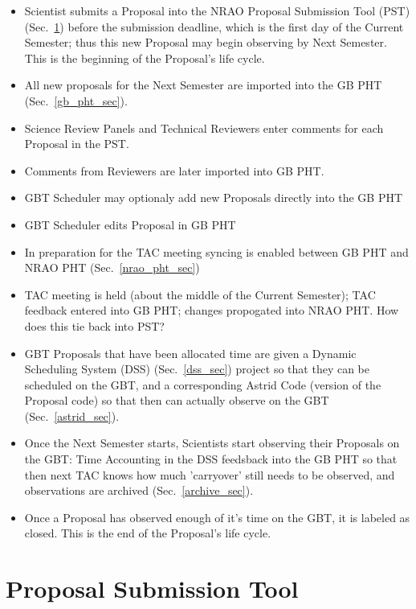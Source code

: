 \documentclass{article}
\begin{document}
\begin{itemize}
\item Scientist submits a Proposal into the NRAO Proposal Submission Tool
(PST) (Sec.~\ref{pst_sec}) before the submission deadline, which is the first day of the Current
Semester; thus this new Proposal may begin observing by Next Semester.  This
is the beginning of the Proposal's life cycle.
\item All new proposals for the Next Semester are imported into the GB PHT (Sec.~\ref{gb_pht_sec}).
\item Science Review Panels and Technical Reviewers enter comments for each
Proposal in the PST.
\item Comments from Reviewers are later imported into GB PHT.
\item GBT Scheduler may optionaly add new Proposals directly into the GB PHT
\item GBT Scheduler edits Proposal in GB PHT
\item In preparation for the TAC meeting syncing is enabled between GB PHT and NRAO PHT (Sec.~\ref{nrao_pht_sec})
\item TAC meeting is held (about the middle of the Current Semester); TAC
feedback entered into GB PHT; changes propogated into NRAO PHT.  How does this
tie back into PST?
\item GBT Proposals that have been allocated time are given a Dynamic
Scheduling System (DSS) (Sec.~\ref{dss_sec}) project so that they can be scheduled on the GBT, and
a corresponding Astrid Code (version of the Proposal code) so that then can
actually observe on the GBT (Sec.~\ref{astrid_sec}).
\item Once the Next Semester starts, Scientists start observing their
Proposals on the GBT:
Time Accounting in the DSS feedsback into the GB PHT so that then next TAC
knows how much 'carryover' still needs to be observed, and observations are
archived (Sec.~\ref{archive_sec}).
\item Once a Proposal has observed enough of it's time on the GBT, it is
labeled as closed.  This is the end of the Proposal's life cycle.

\end{itemize}

\clearpage

\section{Proposal Submission Tool}\label{pst_sec}
\end{document}
